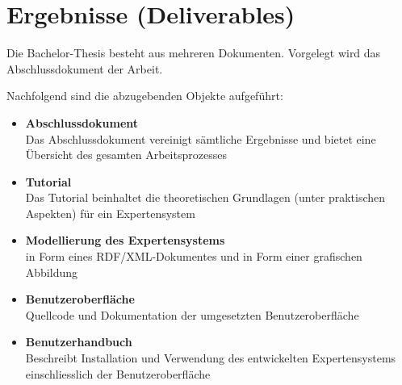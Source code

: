 \section{Ergebnisse (Deliverables)}
\label{sec:admin_ergebniss}
Die Bachelor-Thesis besteht aus mehreren Dokumenten. Vorgelegt wird das Abschlussdokument der Arbeit.

Nachfolgend sind die abzugebenden Objekte aufgeführt:
\begin{itemize}
	\item \textbf{Abschlussdokument} \\
        Das Abschlussdokument vereinigt sämtliche Ergebnisse und bietet eine Übersicht des gesamten Arbeitsprozesses
	\item \textbf{Tutorial} \\
        Das Tutorial beinhaltet die theoretischen Grundlagen (unter praktischen Aspekten) für ein Expertensystem
	\item \textbf{Modellierung des Expertensystems} \\
        in Form eines RDF/XML-Dokumentes und in Form einer grafischen Abbildung
	\item \textbf{Benutzeroberfläche} \\
        Quellcode und Dokumentation der umgesetzten Benutzeroberfläche
	\item \textbf{Benutzerhandbuch} \\
        Beschreibt Installation und Verwendung des entwickelten Expertensystems einschliesslich der Benutzeroberfläche
\end{itemize}
